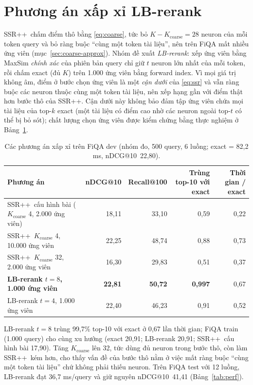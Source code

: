 \documentclass[a4paper,13pt]{extreport}
\makeatletter
\theoremstyle{plain}
\newcommand{\ssrpp}{SSR++}
\newcommand{\ndcg}{nDCG@10}
\makeatother
\begin{document}
\section{Phương án xấp xỉ LB-rerank}
\label{sec:lbrerank}
\ssrpp\ chấm điểm thô bằng \eqref{eq:coarse}, tức bỏ $K-K_{\text{coarse}}=28$ neuron của mỗi token query và bỏ ràng buộc ``cùng một token tài liệu'', nên trên FiQA mất nhiều ứng viên (mục~\ref{sec:coarse-approx}). Nhóm đề xuất \emph{LB-rerank}: xếp ứng viên bằng MaxSim \emph{chính xác} của phiên bản query chỉ giữ $t$ neuron lớn nhất của mỗi token, rồi chấm exact (đủ $K$) trên 1.000 ứng viên bằng forward index. Vì mọi giá trị không âm, điểm ở bước chọn ứng viên là một \emph{cận dưới} của \eqref{eq:ssr} và vẫn ràng buộc các neuron thuộc cùng một token tài liệu, nên xếp hạng gần với điểm thật hơn bước thô của \ssrpp. Cận dưới này không bảo đảm tập ứng viên chứa mọi tài liệu của top-$k$ exact (một tài liệu có điểm cao nhờ các neuron ngoài top-$t$ có thể bị bỏ sót); chất lượng chọn ứng viên được kiểm chứng bằng thực nghiệm ở Bảng~\ref{tab:approx}.

\begin{table}[htbp]
\centering
\caption[Các phương án xấp xỉ trên FiQA dev (nhóm đo)]{Các phương án xấp xỉ trên FiQA dev (nhóm đo, 500 query, 6 luồng; exact = 82,2 ms, \ndcg\ 22,80).}
\label{tab:approx}
\footnotesize
\begin{tabular}{lrrrr}
\toprule
\textbf{Phương án} & \textbf{\ndcg} & \textbf{Recall@100} & \textbf{Trùng top-10 với exact} & \textbf{Thời gian / exact}\\
\midrule
\ssrpp\ cấu hình bài ($K_{\text{coarse}}$ 4, 2.000 ứng viên) & 18,11 & 33,10 & 0,59 & 0,22\\
\ssrpp\ $K_{\text{coarse}}$ 4, 10.000 ứng viên & 22,25 & 48,74 & 0,88 & 0,73\\
\ssrpp\ $K_{\text{coarse}}$ 32, 2.000 ứng viên & 16,30 & 29,83 & 0,51 & 0,37\\
\textbf{LB-rerank $t=8$, 1.000 ứng viên} & \textbf{22,81} & \textbf{50,72} & \textbf{0,997} & 0,67\\
LB-rerank $t=4$, 1.000 ứng viên & 22,40 & 46,23 & 0,91 & 0,52\\
\bottomrule
\end{tabular}
\end{table}
LB-rerank $t=8$ trùng 99,7\% top-10 với exact ở 0,67 lần thời gian; FiQA train (1.000 query) cho cùng xu hướng (exact 20,91; LB-rerank 20,91; \ssrpp\ cấu hình bài 17,90). Tăng $K_{\text{coarse}}$ lên 32, tức dùng đủ neuron trong bước thô, còn làm \ssrpp\ kém hơn, cho thấy vấn đề của bước thô nằm ở việc mất ràng buộc ``cùng một token tài liệu'' chứ không phải thiếu neuron. Trên FiQA test với 12 luồng, LB-rerank đạt 36,7 ms/query và giữ nguyên \ndcg\ 41,41 (Bảng~\ref{tab:perf}).
\end{document}
